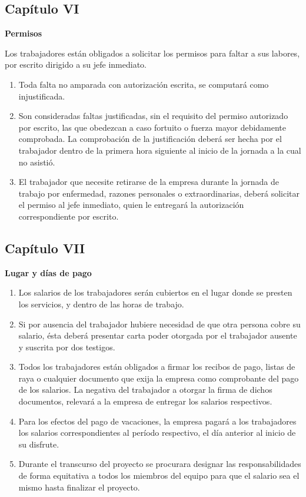 \documentclass[11pt,letterpaper]{report}
\begin{document}
\subsection{Capítulo VI}
\begin{center}
{\bf Permisos}
\end{center}
Los trabajadores están obligados a solicitar los permisos para faltar a sus labores, por escrito dirigido a su jefe inmediato.
\begin{enumerate}
\item Toda falta no amparada con autorización escrita, se computará como injustificada.
\item Son consideradas faltas justificadas, sin el requisito del permiso autorizado por escrito, las que obedezcan a caso fortuito o fuerza mayor debidamente comprobada. La comprobación de la justificación deberá ser hecha por el trabajador dentro de la primera hora siguiente al inicio de la jornada a la cual no asistió.
\item El trabajador que necesite retirarse de la empresa durante la jornada de trabajo por enfermedad, razones personales o extraordinarias, deberá solicitar el permiso al jefe inmediato, quien le entregará la autorización correspondiente por escrito.
\end{enumerate}
\subsection{Capítulo VII}
\begin{center}
{\bf Lugar y días de pago}
\end{center}

\begin{enumerate}
\item Los salarios de los trabajadores serán cubiertos en el lugar donde se presten los servicios, y dentro de las horas de trabajo.
\item Si por ausencia del trabajador hubiere necesidad de que otra persona cobre su salario, ésta deberá presentar carta poder otorgada por el trabajador ausente y suscrita por dos testigos.
\item Todos los trabajadores están obligados a firmar los recibos de pago, listas de raya o cualquier documento que exija la empresa como comprobante del pago de los salarios. La negativa del trabajador a otorgar la firma de dichos documentos, relevará a la empresa de entregar los salarios respectivos.
\item Para los efectos del pago de vacaciones, la empresa pagará a los trabajadores los salarios correspondientes al período respectivo, el día anterior al inicio de su disfrute.
\item Durante el transcurso del proyecto se procurara designar las responsabilidades de forma equitativa a todos los miembros del equipo para que el salario sea el mismo hasta finalizar el proyecto.
\end{enumerate}
\end{document}
